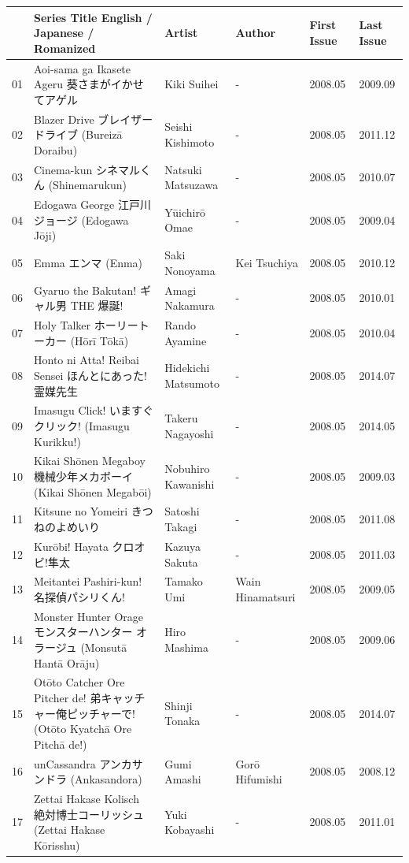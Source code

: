 \documentclass{article}
\begin{document}
\begin{tabular}{llllll}
\toprule
 & Series Title English / Japanese / Romanized & Artist & Author & First Issue & Last Issue \\
\midrule
01 & Aoi-sama ga Ikasete Ageru 葵さまがイかせてアゲル & Kiki Suihei & - & 2008.05 & 2009.09 \\
02 & Blazer Drive ブレイザードライブ (Bureizā Doraibu) & Seishi Kishimoto & - & 2008.05 & 2011.12 \\
03 & Cinema-kun シネマルくん (Shinemarukun) & Natsuki Matsuzawa & - & 2008.05 & 2010.07 \\
04 & Edogawa George 江戸川ジョージ (Edogawa Jōji) & Yūichirō Omae & - & 2008.05 & 2009.04 \\
05 & Emma エンマ (Enma) & Saki Nonoyama & Kei Tsuchiya & 2008.05 & 2010.12 \\
06 & Gyaruo the Bakutan! ギャル男 THE 爆誕! & Amagi Nakamura & - & 2008.05 & 2010.01 \\
07 & Holy Talker ホーリートーカー (Hōrī Tōkā) & Rando Ayamine & - & 2008.05 & 2010.04 \\
08 & Honto ni Atta! Reibai Sensei ほんとにあった!霊媒先生 & Hidekichi Matsumoto & - & 2008.05 & 2014.07 \\
09 & Imasugu Click! いますぐクリック! (Imasugu Kurikku!) & Takeru Nagayoshi & - & 2008.05 & 2014.05 \\
10 & Kikai Shōnen Megaboy 機械少年メカボーイ (Kikai Shōnen Megabōi) & Nobuhiro Kawanishi & - & 2008.05 & 2009.03 \\
11 & Kitsune no Yomeiri きつねのよめいり & Satoshi Takagi & - & 2008.05 & 2011.08 \\
12 & Kurōbi! Hayata クロオビ!隼太 & Kazuya Sakuta & - & 2008.05 & 2011.03 \\
13 & Meitantei Pashiri-kun! 名探偵パシリくん! & Tamako Umi & Wain Hinamatsuri & 2008.05 & 2009.05 \\
14 & Monster Hunter Orage モンスターハンター オラージュ (Monsutā Hantā Orāju) & Hiro Mashima & - & 2008.05 & 2009.06 \\
15 & Otōto Catcher Ore Pitcher de! 弟キャッチャー俺ピッチャーで! (Otōto Kyatchā Ore Pitchā de!) & Shinji Tonaka & - & 2008.05 & 2014.07 \\
16 & unCassandra アンカサンドラ (Ankasandora) & Gumi Amashi & Gorō Hifumishi & 2008.05 & 2008.12 \\
17 & Zettai Hakase Kolisch 絶対博士コーリッシュ (Zettai Hakase Kōrisshu) & Yuki Kobayashi & - & 2008.05 & 2011.01 \\

\end{tabular}
\end{document}

